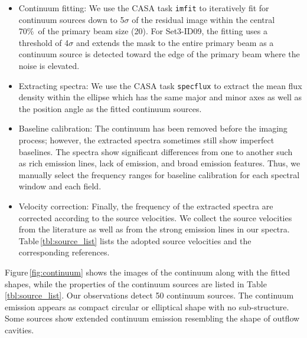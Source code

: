 \documentclass[twocolumn]{aastex62}
\begin{document}
\begin{itemize}
  \item Continuum fitting: We use the CASA task \texttt{imfit} to iteratively fit for continuum sources down to 5$\sigma$ of the residual image within the central 70\%\ of the primary beam size (20\arcsec).  For Set3-ID09, the fitting uses a threshold of 4$\sigma$ and extends the mask to the entire primary beam as a continuum source is detected toward the edge of the primary beam where the noise is elevated.
  \item Extracting spectra:  We use the CASA task \texttt{specflux} to extract the mean flux density within the ellipse which has the same major and minor axes as well as the position angle as the fitted continuum sources.
  \item Baseline calibration:  The continuum has been removed before the imaging process; however, the extracted spectra sometimes still show imperfect baselines.  The spectra show significant differences from one to another such as rich emission lines, lack of emission, and broad emission features.  Thus, we manually select the frequency ranges for baseline calibration for each spectral window and each field.
  \item Velocity correction:  Finally, the frequency of the extracted spectra are corrected according to the source velocities.  We collect the source velocities from the literature as well as from the strong emission lines in our spectra.  Table\,\ref{tbl:source_list} lists the adopted source velocities and the corresponding references.
\end{itemize}

Figure\,\ref{fig:continuum} shows the images of the continuum along with the fitted shapes, while the properties of the continuum sources are listed in Table\,\ref{tbl:source_list}.  Our observations detect 50 continuum sources.    The continuum emission appears as compact circular or elliptical shape with no sub-structure.  Some sources show extended continuum emission resembling the shape of outflow cavities.
\end{document}
